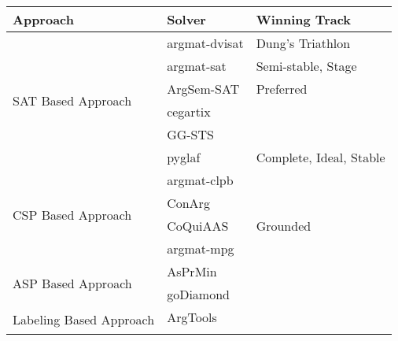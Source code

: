\begin{table}[]
	\begin{tabular}{lll}
		\textbf{Approach}                                                      & \textbf{Solver}                      & \textbf{Winning Track}           \\ \hline \hline
		\multicolumn{1}{l|}{\multirow{6}{*}{SAT Based Approach}}      & argmat-dvisat               & Dung's Triathlon        \\ \cline{2-3} 
		\multicolumn{1}{l|}{}                                         & argmat-sat                  & Semi-stable, Stage      \\ \cline{2-3} 
		\multicolumn{1}{l|}{}                                         & ArgSem-SAT                  & Preferred               \\ \cline{2-3} 
		\multicolumn{1}{l|}{}                                         & cegartix                    &                         \\ \cline{2-3} 
		\multicolumn{1}{l|}{}                                         & GG-STS                      &                         \\ \cline{2-3} 
		\multicolumn{1}{l|}{}                                         & pyglaf                      & Complete, Ideal, Stable \\ \hline
		\multicolumn{1}{l|}{\multirow{4}{*}{CSP Based Approach}}      & argmat-clpb                 &                         \\ \cline{2-3} 
		\multicolumn{1}{l|}{}                                         & ConArg                      &                         \\ \cline{2-3} 
		\multicolumn{1}{l|}{}                                         & CoQuiAAS                    & Grounded                \\ \cline{2-3} 
		\multicolumn{1}{l|}{}                                         & argmat-mpg                    &     \\
		 \hline
		\multicolumn{1}{l|}{\multirow{2}{*}{ASP Based Approach}}      & AsPrMin                     &                         \\ \cline{2-3} 
		\multicolumn{1}{l|}{}                                         & goDiamond                   &                         \\ \hline
		\multicolumn{1}{l|}{\multirow{3}{*}{Labeling Based Approach}} & ArgTools                    &                         \\ \cline{2-3} 

\end{tabular}
\end{table}
